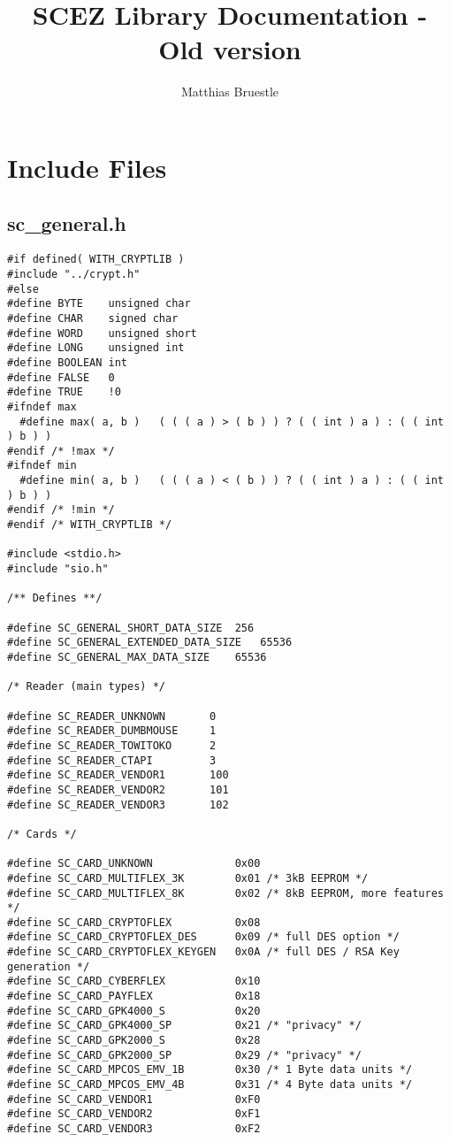 \documentclass[a4paper,oneside]{article}
\title{SCEZ Library Documentation - Old version}
\author{Matthias Bruestle}
\begin{document}
\maketitle

\tableofcontents

\section{Include Files}


\subsection{sc\_general.h}

\begin{verbatim}
#if defined( WITH_CRYPTLIB )
#include "../crypt.h"
#else
#define BYTE	unsigned char
#define	CHAR	signed char
#define	WORD	unsigned short
#define	LONG	unsigned int
#define BOOLEAN	int
#define FALSE	0
#define TRUE	!0
#ifndef max
  #define max( a, b )   ( ( ( a ) > ( b ) ) ? ( ( int ) a ) : ( ( int ) b ) )
#endif /* !max */
#ifndef min
  #define min( a, b )   ( ( ( a ) < ( b ) ) ? ( ( int ) a ) : ( ( int ) b ) )
#endif /* !min */
#endif /* WITH_CRYPTLIB */

#include <stdio.h>
#include "sio.h"

/** Defines **/

#define	SC_GENERAL_SHORT_DATA_SIZE	256
#define	SC_GENERAL_EXTENDED_DATA_SIZE	65536
#define	SC_GENERAL_MAX_DATA_SIZE	65536

/* Reader (main types) */

#define SC_READER_UNKNOWN		0
#define SC_READER_DUMBMOUSE		1
#define SC_READER_TOWITOKO		2
#define	SC_READER_CTAPI			3
#define	SC_READER_VENDOR1		100
#define	SC_READER_VENDOR2		101
#define	SC_READER_VENDOR3		102

/* Cards */

#define SC_CARD_UNKNOWN				0x00
#define SC_CARD_MULTIFLEX_3K		0x01 /* 3kB EEPROM */
#define SC_CARD_MULTIFLEX_8K		0x02 /* 8kB EEPROM, more features */
#define SC_CARD_CRYPTOFLEX			0x08
#define SC_CARD_CRYPTOFLEX_DES		0x09 /* full DES option */
#define SC_CARD_CRYPTOFLEX_KEYGEN	0x0A /* full DES / RSA Key generation */
#define SC_CARD_CYBERFLEX			0x10
#define	SC_CARD_PAYFLEX				0x18
#define SC_CARD_GPK4000_S			0x20
#define SC_CARD_GPK4000_SP			0x21 /* "privacy" */
#define	SC_CARD_GPK2000_S			0x28
#define	SC_CARD_GPK2000_SP			0x29 /* "privacy" */
#define	SC_CARD_MPCOS_EMV_1B		0x30 /* 1 Byte data units */
#define	SC_CARD_MPCOS_EMV_4B		0x31 /* 4 Byte data units */
#define	SC_CARD_VENDOR1				0xF0
#define	SC_CARD_VENDOR2				0xF1
#define	SC_CARD_VENDOR3				0xF2


\end{verbatim}
\end{document}
